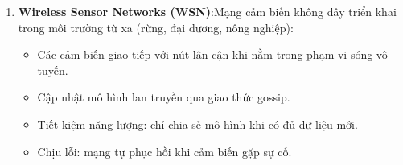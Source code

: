 \begin{enumerate}
    \item \textbf{Wireless Sensor Networks (WSN)}:Mạng cảm biến không dây triển khai trong môi trường từ xa (rừng, đại dương, nông nghiệp):
    \begin{itemize}
    \item Các cảm biến giao tiếp với nút lân cận khi nằm trong phạm vi sóng vô tuyến.
    \item Cập nhật mô hình lan truyền qua giao thức gossip.
    \item Tiết kiệm năng lượng: chỉ chia sẻ mô hình khi có đủ dữ liệu mới. 
    \item Chịu lỗi: mạng tự phục hồi khi cảm biến gặp sự cố.
\end{itemize}
\end{enumerate}
